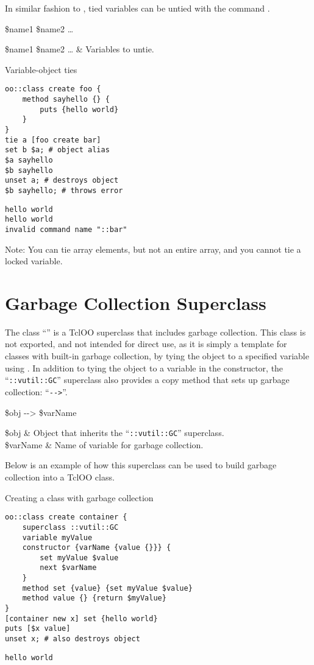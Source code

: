 \documentclass{article}
\begin{document}
In similar fashion to , tied variables can be untied with the command .
\begin{syntax}
 \$name1 \$name2 …
\end{syntax}
\begin{args}
\$name1 \$name2 … & Variables to untie.
\end{args}

\begin{example}{Variable-object ties}
\begin{lstlisting}
oo::class create foo {
    method sayhello {} {
        puts {hello world}
    }
}
tie a [foo create bar]
set b $a; # object alias
$a sayhello
$b sayhello
unset a; # destroys object
$b sayhello; # throws error
\end{lstlisting}
\tcblower
\begin{lstlisting}
hello world
hello world
invalid command name "::bar"
\end{lstlisting}
\end{example}
Note: You can tie array elements, but not an entire array, and you cannot tie a locked variable.
\clearpage
\section{Garbage Collection Superclass}
The class ``\texttt{}'' is a TclOO superclass that includes garbage collection. 
This class is not exported, and not intended for direct use, as it is simply a template for classes with built-in garbage collection, by tying the object to a specified variable using .
In addition to tying the object to a variable in the constructor, the ``\texttt{::vutil::GC}'' superclass also provides a copy method that sets up garbage collection: ``\texttt{-{}->}''.
\begin{syntax}
\$obj -{}-> \$varName
\end{syntax}
\begin{args}
\$obj & Object that inherits the ``\texttt{::vutil::GC}'' superclass. \\
\$varName & Name of variable for garbage collection.
\end{args}

Below is an example of how this superclass can be used to build garbage collection into a TclOO class. 
\begin{example}{Creating a class with garbage collection}
\begin{lstlisting}
oo::class create container {
    superclass ::vutil::GC
    variable myValue
    constructor {varName {value {}}} {
        set myValue $value
        next $varName
    }
    method set {value} {set myValue $value}
    method value {} {return $myValue}
}
[container new x] set {hello world}
puts [$x value]
unset x; # also destroys object
\end{lstlisting}
\tcblower
\begin{lstlisting}
hello world
\end{lstlisting}
\end{example}
\end{document}
